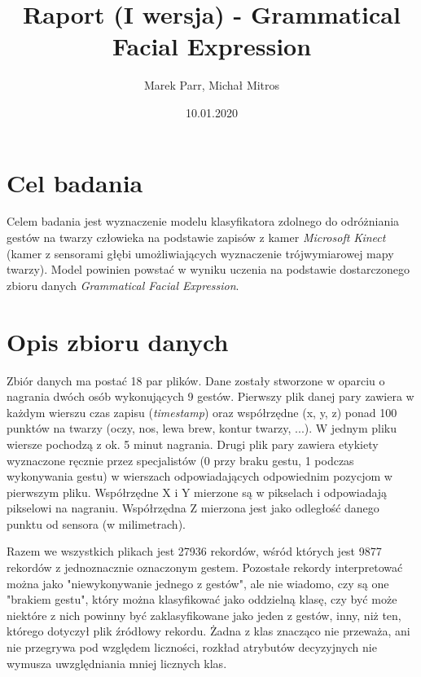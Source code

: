 \documentclass[a4paper,12pt]{article}
\begin{document}
\title{Raport (I wersja) - Grammatical Facial Expression}
\author{Marek Parr, Michał Mitros}
\date{10.01.2020}
\maketitle

\newpage
\section{Cel badania}
\hspace{1cm}Celem badania jest wyznaczenie modelu klasyfikatora zdolnego do odróżniania gestów na twarzy człowieka na podstawie zapisów z kamer \textsl{Microsoft Kinect} (kamer z sensorami głębi umożliwiających wyznaczenie trójwymiarowej mapy twarzy). Model powinien powstać w wyniku uczenia na podstawie dostarczonego zbioru danych \textsl{Grammatical Facial Expression}.

\section{Opis zbioru danych}
\hspace{1cm}Zbiór danych ma postać 18 par plików. Dane zostały stworzone w oparciu o nagrania dwóch osób wykonujących 9 gestów. Pierwszy plik danej pary zawiera w każdym wierszu czas zapisu (\textsl{timestamp}) oraz współrzędne (x, y, z) ponad 100 punktów na twarzy (oczy, nos, lewa brew, kontur twarzy, ...). W jednym pliku wiersze pochodzą z ok. 5 minut nagrania. Drugi plik pary zawiera etykiety wyznaczone ręcznie przez specjalistów (0 przy braku gestu, 1 podczas wykonywania gestu) w wierszach odpowiadających odpowiednim pozycjom w pierwszym pliku.\newline
Współrzędne X i Y mierzone są w pikselach i odpowiadają pikselowi na nagraniu. Współrzędna Z mierzona jest jako odległość danego punktu od sensora (w milimetrach).\newline

\hspace{1cm}Razem we wszystkich plikach jest 27936 rekordów, wśród których jest 9877 rekordów z jednoznacznie oznaczonym gestem. Pozostałe rekordy interpretować można jako "niewykonywanie jednego z gestów", ale nie wiadomo, czy są one "brakiem gestu", który można klasyfikować jako oddzielną klasę, czy być może niektóre z nich powinny być zaklasyfikowane jako jeden z gestów, inny, niż ten, którego dotyczył plik źródłowy rekordu. Żadna z klas znacząco nie przeważa, ani nie przegrywa pod względem liczności, rozkład atrybutów decyzyjnych nie wymusza uwzględniania mniej licznych klas.
\end{document}
